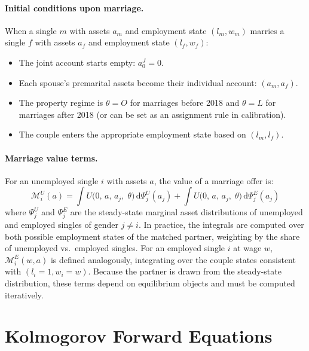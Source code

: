 \documentclass[11pt]{article}
\newcommand{\aJ}{a^{J}}
\begin{document}
\paragraph{Initial conditions upon marriage.} When a single $m$ with assets $a_m$ and employment state $(l_m, w_m)$ marries a single $f$ with assets $a_f$ and employment state $(l_f, w_f)$:
\begin{itemize}
    \item The joint account starts empty: $\aJ_0 = 0$.
    \item Each spouse's premarital assets become their individual account: $(a_m, a_f)$.
    \item The property regime is $\theta = O$ for marriages before 2018 and $\theta = L$ for marriages after 2018 (or can be set as an assignment rule in calibration).
    \item The couple enters the appropriate employment state based on $(l_m, l_f)$.
\end{itemize}

\paragraph{Marriage value terms.} For an unemployed single $i$ with assets $a$, the value of a marriage offer is:
\begin{equation}
    \mathcal{M}_i^U(a) = \int U\bigl(0,\, a,\, a_j,\; \theta\bigr)\, \mathrm{d}\Psi_j^U(a_j) + \int U\bigl(0,\, a,\, a_j,\; \theta\bigr)\, \mathrm{d}\Psi_j^E(a_j)
    \label{eq:marriage_U}
\end{equation}
where $\Psi_j^U$ and $\Psi_j^E$ are the steady-state marginal asset distributions of unemployed and employed singles of gender $j \neq i$. In practice, the integrals are computed over both possible employment states of the matched partner, weighting by the share of unemployed vs.\ employed singles. For an employed single $i$ at wage $w$, $\mathcal{M}_i^E(w, a)$ is defined analogously, integrating over the couple states consistent with $(l_i=1, w_i=w)$. Because the partner is drawn from the steady-state distribution, these terms depend on equilibrium objects and must be computed iteratively.


\section{Kolmogorov Forward Equations}
\label{sec:kfe}
\end{document}
